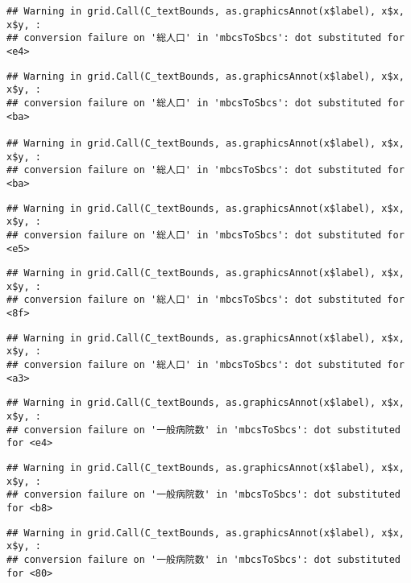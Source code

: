 \documentclass[
]{article}
\begin{document}
\begin{verbatim}
## Warning in grid.Call(C_textBounds, as.graphicsAnnot(x$label), x$x, x$y, :
## conversion failure on '総人口' in 'mbcsToSbcs': dot substituted for <e4>
\end{verbatim}

\begin{verbatim}
## Warning in grid.Call(C_textBounds, as.graphicsAnnot(x$label), x$x, x$y, :
## conversion failure on '総人口' in 'mbcsToSbcs': dot substituted for <ba>

## Warning in grid.Call(C_textBounds, as.graphicsAnnot(x$label), x$x, x$y, :
## conversion failure on '総人口' in 'mbcsToSbcs': dot substituted for <ba>
\end{verbatim}

\begin{verbatim}
## Warning in grid.Call(C_textBounds, as.graphicsAnnot(x$label), x$x, x$y, :
## conversion failure on '総人口' in 'mbcsToSbcs': dot substituted for <e5>
\end{verbatim}

\begin{verbatim}
## Warning in grid.Call(C_textBounds, as.graphicsAnnot(x$label), x$x, x$y, :
## conversion failure on '総人口' in 'mbcsToSbcs': dot substituted for <8f>
\end{verbatim}

\begin{verbatim}
## Warning in grid.Call(C_textBounds, as.graphicsAnnot(x$label), x$x, x$y, :
## conversion failure on '総人口' in 'mbcsToSbcs': dot substituted for <a3>
\end{verbatim}

\begin{verbatim}
## Warning in grid.Call(C_textBounds, as.graphicsAnnot(x$label), x$x, x$y, :
## conversion failure on '一般病院数' in 'mbcsToSbcs': dot substituted for <e4>
\end{verbatim}

\begin{verbatim}
## Warning in grid.Call(C_textBounds, as.graphicsAnnot(x$label), x$x, x$y, :
## conversion failure on '一般病院数' in 'mbcsToSbcs': dot substituted for <b8>
\end{verbatim}

\begin{verbatim}
## Warning in grid.Call(C_textBounds, as.graphicsAnnot(x$label), x$x, x$y, :
## conversion failure on '一般病院数' in 'mbcsToSbcs': dot substituted for <80>
\end{verbatim}
\end{document}
